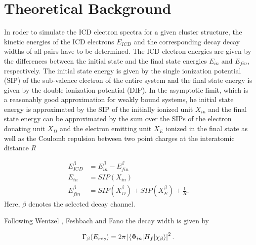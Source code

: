 \section{Theoretical Background}
\label{sec:theory}

In roder to simulate the ICD electron spectra for a given cluster structure,
the kinetic energies of the ICD electrons $E_{ICD}$ and the corresponding decay
decay widths of all pairs have to be determined. The ICD electron energies
are given by the differences between the initial state and the final state
energies $E_{in}$ and $E_{fin}$, respectively. The initial state energy
is given by the single ionization potential (SIP) of the sub-valence electron
of the entire system
and the final state energy is given by the double ionization potential (DIP).
In the asymptotic limit, which is a reasonably good approximation for
weakly bound systems, he initial state energy is approximated by the SIP
of the initially ionized unit $X_{in}$ and the final state energy can be
approximated
by the sum over the SIPs of the electron donating unit $X_D$ and the electron
emitting unit $X_E$ ionized in the final state as well as the
Coulomb repulsion between two point charges at the interatomic distance $R$

\begin{align}
 E_{ICD}^\beta &= E_{in}^\beta - E_{fin}^\beta \label{equation:E_sec}\\
 E_{in}        &= SIP(X_{in}) \label{equation:E_in}\\          
 E_{fin}^\beta &= SIP(X_{D}^\beta) + SIP(X_{E}^\beta) + \frac 1R
           \label{equation:E_fin}                . 
\end{align}
Here, $\beta$ denotes the selected decay channel.

Following Wentzel \cite{Wentzel27}, Feshbach\cite{Feshbach58,Feshbach62}
and Fano \cite{Fano61} the decay width is given by

\begin{equation}
 \Gamma_{\beta}(E_{res}) = 2\pi \left|
                           \braket{\Phi_{in}| H_f |\chi_{\beta}}
                           \right|^2   .
\end{equation}
